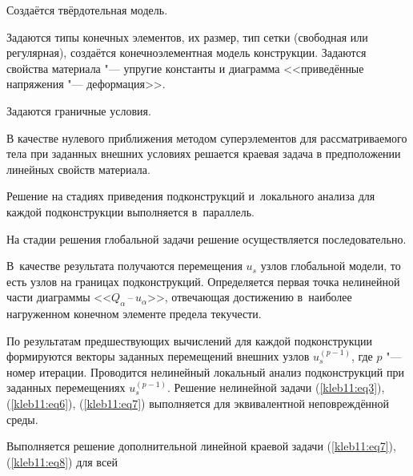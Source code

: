 \begin{description}[{\sc Этап 0.}]







\item[\hypertarget{et:0}{\sc Этап 0.}] Создаётся твёрдотельная модель. 

Задаются типы конечных элементов, их размер, тип сетки (свободная или регулярная), создаётся конечноэлементная модель конструкции. Задаются свойства материала "--- упругие константы и диаграмма <<приведённые напряжения "--- деформация>>. 

Задаются граничные условия.







\item[\hypertarget{et:1}{\sc Этап 1.}] В качестве нулевого приближения методом суперэлементов для рассматриваемого тела при заданных внешних условиях решается краевая задача в предположении линейных свойств материала. 

Решение на стадиях приведения подконструкций и~локального анализа для каждой подконструкции выполняется в~параллель. 

На стадии решения глобальной задачи решение осуществляется последовательно. 

В~качестве результата получаются перемещения $u_s$ узлов глобальной модели, то есть узлов на границах подконструкций. Определяется первая точка нелинейной части диаграммы \mbox{<<$Q_\alpha$\,--\,$u_\alpha$>>}, отвечающая достижению в~наиболее нагруженном конечном элементе предела текучести.







\item[\hypertarget{et:2}{\sc Этап 2.}] По результатам предшествующих вычислений для каждой подконструкции формируются векторы заданных перемещений внешних узлов $u_s^{(p-1)}$, где $p$ "--- номер итерации. Проводится нелинейный локальный анализ подконструкций при заданных перемещениях $u_s^{(p-1)}$. Решение нелинейной задачи (\ref{kleb11:eq3}), (\ref{kleb11:eq6}), (\ref{kleb11:eq7}) выполняется для эквивалентной неповреждённой среды.







\item[\hypertarget{et:3}{\sc Этап 3.}] Выполняется решение дополнительной линейной краевой задачи (\ref{kleb11:eq7}), (\ref{kleb11:eq8}) для всей


\end{description}
